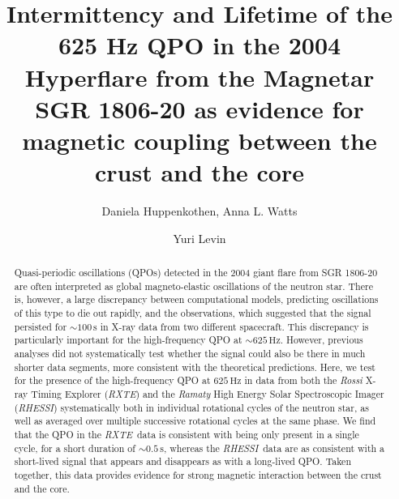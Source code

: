\documentclass{emulateapj}
\begin{document}
\newcommand{\project}[1]{\textsl{#1}}
\newcommand{\fermi}{\project{Fermi}}
\newcommand{\rxte}{\project{RXTE}}
\newcommand{\rhessi}{\project{RHESSI}}
\newcommand{\hz}{\,\mathrm{Hz}}

\title{Intermittency and Lifetime of the 625 Hz QPO in the 2004 Hyperflare from the Magnetar SGR 1806-20 as evidence for magnetic coupling between the crust and the core}
\author{Daniela Huppenkothen, Anna L. Watts}
\author{Yuri Levin}

\begin{abstract}
Quasi-periodic oscillations (QPOs) detected in the 2004 giant flare from SGR 1806-20 are often interpreted as global magneto-elastic oscillations of the neutron star. There is, however, a large discrepancy between computational models, predicting oscillations of this type to die out rapidly, and the observations, which suggested that the signal persisted for $\sim 100\,\mathrm{s}$ in X-ray data from two different spacecraft. This discrepancy is particularly important for the high-frequency QPO at $\sim 625 \hz$. However, previous analyses did not systematically test whether the signal could also be there in much shorter data segments, more consistent with the theoretical predictions. Here, we test for the presence of the high-frequency QPO at $625 \hz$ in data from both the \project{Rossi } X-ray Timing Explorer (\rxte) and the \project{Ramaty} High Energy Solar Spectroscopic Imager (\rhessi) systematically both in individual rotational cycles of the neutron star, as well as averaged over multiple successive rotational cycles at the same phase. We find that the QPO in the \rxte\ data is consistent with being only present in a single cycle, for a short duration of $\sim 0.5 \,\mathrm{s}$, whereas the \rhessi\ data are as consistent with a short-lived signal that appears and disappears as with a long-lived QPO. Taken together, this data provides evidence for strong magnetic interaction between the crust and the core.


\end{abstract} 

\end{document}
